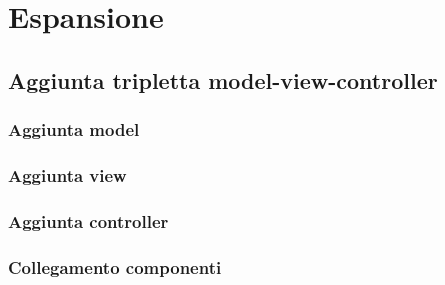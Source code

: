 \section{Espansione}

\subsection{Aggiunta tripletta model-view-controller} \label{sec:aggiuntamvc}

\subsubsection{Aggiunta model}

\subsubsection{Aggiunta view}

\subsubsection{Aggiunta controller}

\subsubsection{Collegamento componenti}